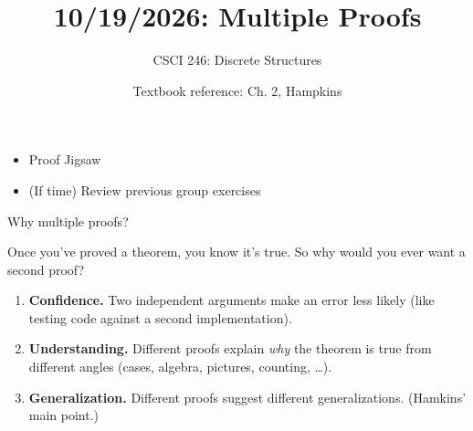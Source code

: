 \documentclass[10pt]{beamer}
\begin{document}






\title{10/19/2026: Multiple Proofs}
\author{CSCI 246: Discrete Structures}
\date{Textbook reference: Ch. 2, Hampkins}

\begin{frame}
    \titlepage 
\end{frame}


\begin{frame}


%

\begin{myyellowbox}[title=Today's Agenda]
\begin{itemize}
	\item Proof Jigsaw
	\item (If time) Review previous group exercises
\end{itemize}

\end{myyellowbox}

\end{frame}

\begin{frame}{Why multiple proofs?}

Once you've proved a theorem, you know it's true.  So why would you ever want a second proof?

\vfill
\pause
\begin{enumerate}
\item \textbf{Confidence.} Two independent arguments make an error less likely (like testing code against a second implementation). \pause
\item \textbf{Understanding.} Different proofs explain \textit{why} the theorem is true from different angles (cases, algebra, pictures, counting, \ldots). \pause
\item \textbf{Generalization.} Different proofs suggest different generalizations.  (Hamkins' main point.)
\end{enumerate}
\end{frame}
\end{document}
